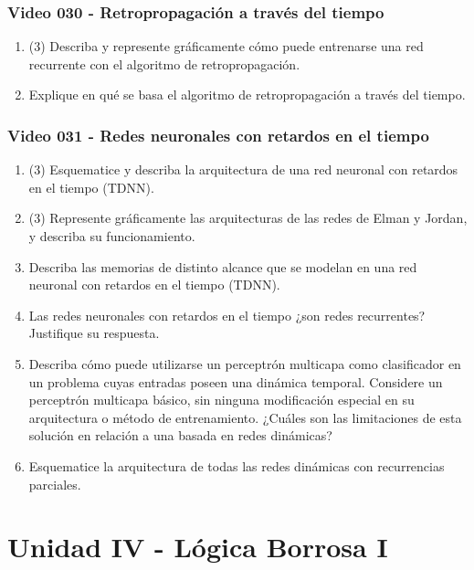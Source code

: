 \documentclass[a4paper,10pt,spanish,oneside]{article}
\begin{document}
\subsubsection{Video 030 - Retropropagación a través del tiempo}

\begin{enumerate}
\item (3) Describa y represente gráficamente cómo puede entrenarse una red recurrente con el algoritmo de retropropagación.

\item Explique en qué se basa el algoritmo de retropropagación a través del tiempo.
\end{enumerate}

\subsubsection{Video 031 - Redes neuronales con retardos en el tiempo}

\begin{enumerate}
\item (3) Esquematice y describa la arquitectura de una red neuronal con retardos en el tiempo (TDNN).

\item (3) Represente gráficamente las arquitecturas de las redes de Elman y Jordan, y describa su funcionamiento.

\item Describa las memorias de distinto alcance que se modelan en una red neuronal con retardos en el tiempo (TDNN).

\item Las redes neuronales con retardos en el tiempo ¿son redes recurrentes? Justifique su respuesta.

\item Describa cómo puede utilizarse un perceptrón multicapa como clasificador en un problema cuyas entradas poseen una dinámica temporal. Considere un perceptrón multicapa básico, sin ninguna modificación especial en su arquitectura o método de entrenamiento. ¿Cuáles son las limitaciones de esta solución en relación a una basada en redes dinámicas?

\item Esquematice la arquitectura de todas las redes dinámicas con recurrencias parciales.
\end{enumerate}

\newpage

\section{Unidad IV - Lógica Borrosa I}
\end{document}
